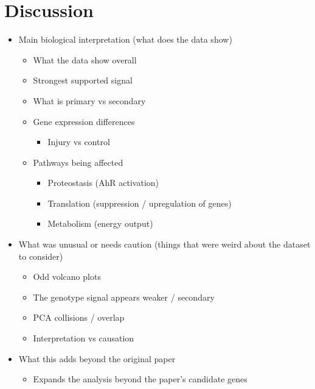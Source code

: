 \documentclass[12pt]{article}
\begin{document}
\section*{\textcolor{nikhicolor}{Discussion}}
\begin{itemize}
\item \textcolor{pitercolor}{Main biological interpretation (what does the data show)}
\begin{itemize}
\item \textcolor{pitercolor}{What the data show overall}
\item \textcolor{pitercolor}{Strongest supported signal}
\item \textcolor{pitercolor}{What is primary vs secondary}
\item \textcolor{pitercolor}{Gene expression differences}
\begin{itemize}
\item \textcolor{pitercolor}{Injury vs control}
\end{itemize}
\item \textcolor{pitercolor}{Pathways being affected}
\begin{itemize}
\item \textcolor{pitercolor}{Proteostasis (AhR activation)}
\item \textcolor{pitercolor}{Translation (suppression / upregulation of genes)}
\item \textcolor{pitercolor}{Metabolism (energy output)}
\end{itemize}
\end{itemize}
\item \textcolor{nikhicolor}{What was unusual or needs caution (things that were weird about the dataset to consider)}
\begin{itemize}
\item \textcolor{nikhicolor}{Odd volcano plots}
\item \textcolor{nikhicolor}{The genotype signal appears weaker / secondary}
\item \textcolor{nikhicolor}{PCA collisions / overlap}
\item \textcolor{nikhicolor}{Interpretation vs causation}
\end{itemize}
\item \textcolor{pitercolor}{What this adds beyond the original paper}
\begin{itemize}
\item \textcolor{pitercolor}{Expands the analysis beyond the paper’s candidate genes}
\begin{itemize}

\end{itemize}
\end{itemize}
\end{itemize}
\end{document}
